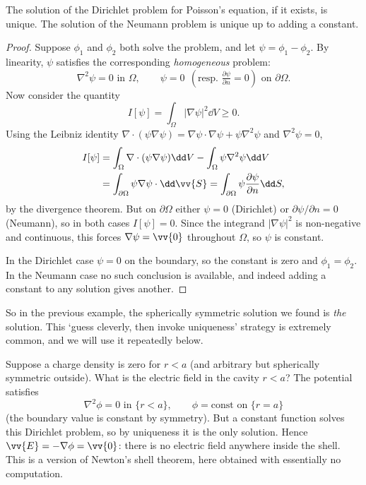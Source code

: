 \begin{theorem}
	The solution of the Dirichlet problem for Poisson's equation, if it exists, is unique. The solution of the Neumann problem is unique up to adding a constant.
\end{theorem}
\begin{proof}
	Suppose $\phi_1$ and $\phi_2$ both solve the problem, and let $\psi = \phi_1 - \phi_2$. By linearity, $\psi$ satisfies the corresponding \emph{homogeneous} problem:
	$$
	\nabla^2 \psi = 0 \text{ in } \Omega, \quad \quad \psi = 0 \;\, \left(\text{resp. } \tfrac{\partial \psi}{\partial n} = 0\right) \text{ on } \partial \Omega.
	$$
	Now consider the quantity
	$$
	I[\psi] = \int_\Omega |\nabla \psi|^2 \dd V \geq 0.
	$$
	Using the Leibniz identity $\nabla \cdot (\psi \nabla \psi) = \nabla \psi \cdot \nabla \psi + \psi \nabla^2 \psi$ and $\nabla^2 \psi = 0$,
	\begin{align*}
		I[\psi] &= \int_\Omega \nabla \cdot (\psi \nabla \psi) \dd V - \int_\Omega \psi \nabla^2 \psi \dd V \\
		&= \int_{\partial \Omega} \psi \nabla \psi \cdot \dd \vv{S} = \int_{\partial \Omega} \psi \frac{\partial \psi}{\partial n} \dd S,
	\end{align*}
	by the divergence theorem. But on $\partial \Omega$ either $\psi = 0$ (Dirichlet) or $\partial \psi/\partial n = 0$ (Neumann), so in both cases $I[\psi] = 0$. Since the integrand $|\nabla \psi|^2$ is non-negative and continuous, this forces $\nabla \psi = \vv{0}$ throughout $\Omega$, so $\psi$ is constant.

	In the Dirichlet case $\psi = 0$ on the boundary, so the constant is zero and $\phi_1 = \phi_2$. In the Neumann case no such conclusion is available, and indeed adding a constant to any solution gives another.
\end{proof}

So in the previous example, the spherically symmetric solution we found is \emph{the} solution. This `guess cleverly, then invoke uniqueness' strategy is extremely common, and we will use it repeatedly below.

\begin{example}
	Suppose a charge density is zero for $r < a$ (and arbitrary but spherically symmetric outside). What is the electric field in the cavity $r < a$? The potential satisfies
	$$
	\nabla^2 \phi = 0 \text{ in } \{r < a\}, \quad \quad \phi = \text{const on } \{r = a\}
	$$
	(the boundary value is constant by symmetry). But a constant function solves this Dirichlet problem, so by uniqueness it is the only solution. Hence $\vv{E} = -\nabla \phi = \vv{0}$: there is no electric field anywhere inside the shell. This is a version of Newton's shell theorem, here obtained with essentially no computation.
\end{example}

